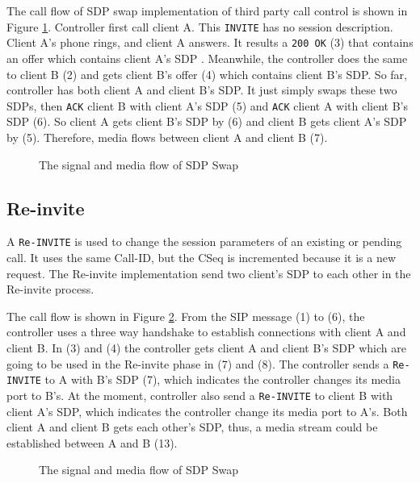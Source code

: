 The call flow of SDP swap implementation of third party call control is shown in Figure \ref{fig:SdpSwap}. Controller first call client A. This \texttt{INVITE} has no session description. Client A's phone rings, and client A answers. It results a \texttt{200 OK} (3) that contains an offer which contains client A's SDP \cite{RFC3261}. Meanwhile, the controller does the same to client B (2) and gets client B's offer (4) which contains client B's SDP. So far, controller has both client A and client B's SDP. It just simply swaps these two SDPs, then \texttt{ACK} client B with client A's SDP (5) and \texttt{ACK} client A with client B's SDP (6). So client A gets client B's SDP by (6) and client B gets client A's SDP by (5). Therefore, media flows between client A and client B (7).

\begin{figure}[!hbtp]
\centering
{}
\caption{The signal and media flow of SDP Swap}
\label{fig:SdpSwap}
\end{figure}

\subsection{Re-invite}
\label{sec:Solution:ThirdPartyCall:Re-invite}

A \texttt{Re-INVITE} is used to change the session parameters of an existing or pending call. It uses the same Call-ID, but the CSeq is incremented because it is a new request. The Re-invite implementation send two client's SDP to each other in the Re-invite process. 

The call flow is shown in Figure \ref{fig:Re-invite}. From the SIP message (1) to (6), the controller uses a three way handshake to establish connections with client A and client B. In (3) and (4) the controller gets client A and client B's SDP which are going to be used in the Re-invite phase in (7) and (8). The controller sends a \texttt{Re-INVITE} to A with B's SDP (7), which indicates the controller changes its media port to B's. At the moment, controller also send a \texttt{Re-INVITE} to client B with client A's SDP, which indicates the controller change its media port to A's. Both client A and client B gets each other's SDP, thus, a media stream could be established between A and B (13).

\begin{figure}[!hbtp]
\centering
{}
\caption{The signal and media flow of SDP Swap}
\label{fig:Re-invite}
\end{figure}

